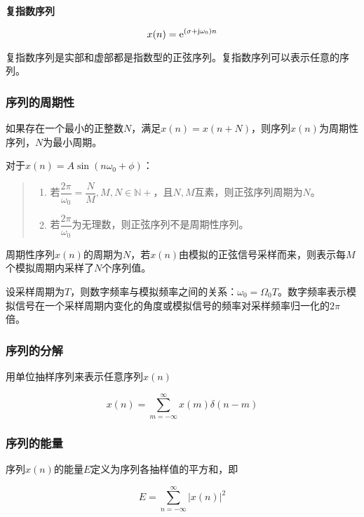 \documentclass[cn, hazy, blue, normal, 12pt]{elegantnote}
\begin{document}
\textbf{复指数序列}

\begin{equation}
        x(n)={\rm{e}}^{(\sigma+{\rm{j}}\omega_0)n}
\end{equation}

复指数序列是实部和虚部都是指数型的正弦序列。复指数序列可以表示任意的序列。

\subsubsection{序列的周期性}

如果存在一个最小的正整数$N$，满足$x(n)=x(n+N)$，则序列$x(n)$为周期性序列，$N$为最小周期。

对于$x(n)=A\sin(n\omega_0+\phi)$：

\begin{quote}
\begin{enumerate}
    \item 若$\dfrac{2\pi}{\omega_0}=\dfrac{N}{M}, M,N\in\mathbb{N+}$，且$N, M$互素，则正弦序列周期为$N$。
    \item 若$\dfrac{2\pi}{\omega_0}$为无理数，则正弦序列不是周期性序列。
\end{enumerate}
\end{quote}

周期性序列$x(n)$的周期为$N$，若$x(n)$由模拟的正弦信号采样而来，则表示每$M$个模拟周期内采样了$N$个序列值。

设采样周期为$T$，则数字频率与模拟频率之间的关系：$\omega_0=\Omega_0T$。数字频率表示模拟信号在一个采样周期内变化的角度或模拟信号的频率对采样频率归一化的$2\pi$倍。

\subsubsection{序列的分解}

用单位抽样序列来表示任意序列$x(n)$

\begin{equation}
        x(n)=\sum_{m=-\infty}^{\infty}{x(m)\delta(n-m)}
\end{equation}

\subsubsection{序列的能量}

序列$x(n)$的能量$E$定义为序列各抽样值的平方和，即

\begin{equation}
        E=\sum_{n=-\infty}^{\infty}{|x(n)|^2}
\end{equation}
\end{document}
